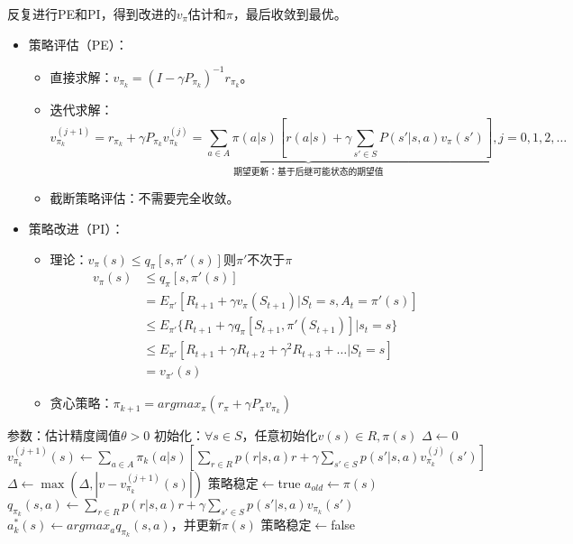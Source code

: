 \documentclass[
12pt, %
a4paper, 
oneside, %
headinclude,footinclude, %
]{scrartcl}
\begin{document}
反复进行PE和PI，得到改进的$ v_{\pi} $估计和$ \pi $，最后收敛到最优。
\begin{itemize}
\item 策略评估（PE）：
\begin{itemize}
\item 直接求解：$ v_{\pi_k} = (I - \gamma P_{\pi_k})^{-1} r_{\pi_k} $。
\item 迭代求解：
$$ \underbrace{v_{\pi_k}^{(j + 1)} = r_{\pi_k} + \gamma P_{\pi_k} v_{\pi_k}^{(j)} = \sum_{a \in A} \pi(a|s)[r(a|s) + \gamma \sum_{s' \in S}P(s'|s, a)v_{\pi}(s')], j = 0, 1, 2, \dots}_{\text{期望更新：基于后继可能状态的期望值}} $$
\item 截断策略评估：不需要完全收敛。
\end{itemize}
\item 策略改进（PI）：
\begin{itemize}
\item 理论：$ v_{\pi}(s) \leq q_{\pi}[s, \pi'(s)] $则$ \pi' $不次于$ \pi $
\begin{align*}
v_{\pi}(s) &\leq q_{\pi}[s, \pi'(s)] \\
&= E_{\pi'} [R_{t + 1} + \gamma v_{\pi}(S_{t + 1})|S_t = s, A_t = \pi'(s)] \\
&\leq E_{\pi'} \{R_{t + 1} + \gamma q_{\pi}[S_{t + 1}, \pi'(S_{t + 1})]|s_t = s\} \\
&\leq E_{\pi'} [R_{t + 1} + \gamma R_{t + 2} + \gamma^2 R_{t + 3} + \dots|S_t = s] \\
&= v_{\pi'}(s)
\end{align*}
\item 贪心策略：$ \pi_{k + 1} = argmax_{\pi}(r_{\pi} + \gamma P_{\pi} v_{\pi_k}) $
\end{itemize}
\end{itemize}
\begin{myalgorithm}[策略迭代]
\State 参数：估计精度阈值$ \theta > 0 $
\State 初始化：$ \forall s \in S $，任意初始化$ v(s) \in R, \pi(s) $
\Repeat
\Repeat {}
\State $ \Delta \gets 0 $
\State $ v_{\pi_k}^{(j + 1)}(s) \gets \sum_{a \in A} \pi_k(a|s)[\sum_{r \in R} p(r|s,a)r + \gamma \sum_{s' \in S} p(s'|s,a) v_{\pi_k}^{(j)}(s')] $
\State $ \Delta \gets \max(\Delta, |v - v_{\pi_k}^{(j + 1)}(s)|) $
\EndFor
\Until{$ \Delta < \theta $}
\State 策略稳定$ \gets $true 
\State $ a_{old} \gets \pi(s) $
\State $ q_{\pi_k}(s, a) \gets \sum_{r \in R} p(r|s, a)r + \gamma \sum_{s' \in S} p(s'|s, a)v_{\pi_k}(s') $
\EndFor
\State $ a^*_k(s) \gets argmax_a q_{\pi_k}(s, a) $，并更新$ \pi(s)  $
\State 策略稳定$ \gets $false
\EndIf
\EndFor
{}
\end{myalgorithm}
\end{document}
